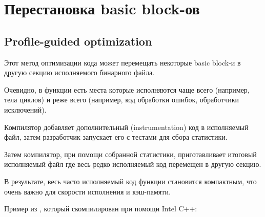 \section{Перестановка basic block-ов}


\subsection{Profile-guided optimization}
\label{PGO}

\myindex{\oracle}

Этот метод оптимизации кода может перемещать некоторые \gls{basic block}-и в другую секцию
исполняемого бинарного файла.

Очевидно, в функции есть места которые исполняются чаще всего (например, тела циклов)
и реже всего (например, код обработки ошибок, обработчики исключений).

Компилятор добавляет дополнительный (instrumentation) код в исполняемый файл,
затем разработчик запускает его с тестами для сбора статистики.

Затем компилятор, при помощи собранной статистики, приготавливает итоговый исполняемый
файл где весь редко исполняемый код перемещен в другую секцию.

В результате, весь часто исполняемый код функции становится компактным, что очень важно для скорости
исполнения и кэш-памяти.

Пример из \oracle, который скомпилирован при помощи Intel C++:

